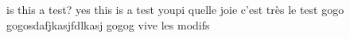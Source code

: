 \documentclass{article}
\begin{document}
is this a test?
yes this is a test
youpi
quelle joie
c'est très le test
gogo gogosdafjkasjfdlkasj
gogog
vive les modifs
\end{document}
